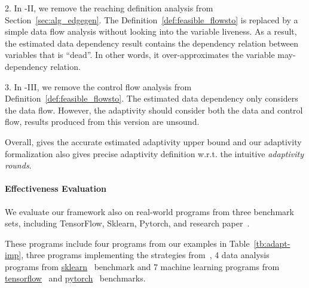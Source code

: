 2. In {\THESYSTEM}-II, we remove the reaching definition analysis from Section~\ref{sec:alg_edgegen}.
The Definition~\ref{def:feasible_flowsto} is replaced by a simple data flow analysis without looking into the variable liveness.
As a result, the estimated data dependency result contains the dependency relation between variables that is ``dead''. In other words, it over-approximates the variable may-dependency relation.

3. In {\THESYSTEM}-III, we remove the control flow analysis from Definition~\ref{def:feasible_flowsto}.
The estimated data dependency only considers the data flow.
However, the adaptivity should consider both the data and control flow, results produced from this version are unsound.

Overall, {\THESYSTEM} gives the accurate estimated
adaptivity upper bound and our adaptivity formalization also gives precise adaptivity definition w.r.t. the intuitive \emph{adaptivity rounds}.


\paragraph{Effectiveness Evaluation}

We evaluate our framework also on real-world programs from
three benchmark sets, including TensorFlow, Sklearn, Pytorch, and research paper~\cite{Jamieson2015TheAO}.

These programs include 
four programs from our examples in Table~\ref{tb:adapt-imp},
three programs implementing the strategies from~\cite{Jamieson2015TheAO},
4 data analysis programs 
from \hyperlink{https://github.com/scikit-learn/scikit-learn/tree/main/examples}{sklearn}~\cite{SklearnBenchmark} benchmark
and
7 machine learning programs
from \hyperlink{https://github.com/tensorflow/tensorflow/tree/master/tensorflow/examples}{tensorflow}~\cite{TensorflowBenchmark}
and \hyperlink{https://github.com/pytorch/pytorch}{pytorch}~\cite{PytorchBenchmark}
benchmarks.


